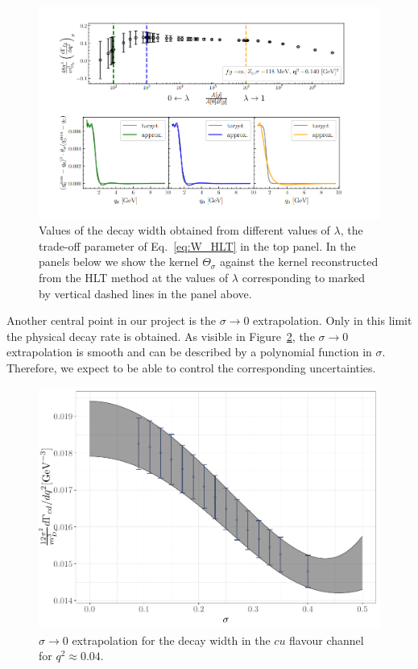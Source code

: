 \documentclass [a4paper, 11pt]{article}
\begin{document}
\begin{figure}
  \includegraphics[scale=0.5]{figures/Screenshot from 2024-07-27 18-12-04.png}
  \caption{Values of the decay width obtained from different values of $\lambda$, the trade-off
    parameter of Eq.~\ref{eq:W_HLT} in the top panel. In the panels below we show the kernel $\Theta_\sigma$ against the kernel reconstructed from the HLT method at the values of  $\lambda$ corresponding to
    marked by vertical dashed lines in the panel above.
  }
  \label{fig:stability}
\end{figure}

Another central point in our project is the $\sigma \to 0$
extrapolation. Only in this limit the physical decay rate is obtained.
As visible in Figure~\ref{fig:sigma_extrapolation}, the
$\sigma \to 0$ extrapolation is smooth and can be described by 
a polynomial function in $\sigma$. Therefore, we expect to be able to
control the corresponding uncertainties.

\begin{figure}
  \centering
  \includegraphics[scale=0.5]{figures/sigma_extrapolation.pdf}
  \caption{ $\sigma \to 0 $ extrapolation for the decay width in the
    $cu$ flavour channel for $q^2\approx 0.04$. 
  }
  \label{fig:sigma_extrapolation}
\end{figure}
\end{document}
